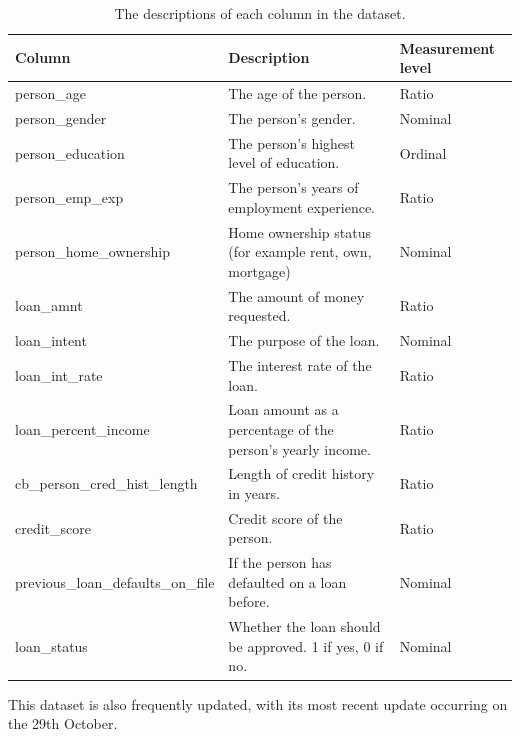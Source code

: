 \documentclass[12pt]{report}
\begin{document}
\begin{table}[H]
    \centering
    \begin{tabular}{|p{}| p{}| p{} |}
        \hline
        \cellcolor{blue!25}Column & \cellcolor{blue!25}Description & \cellcolor{blue!25}Measurement level\\
            \hline
            person\_age & The age of the person. & Ratio\\
            \hline
            person\_gender & The person's gender. & Nominal\\
            \hline
            person\_education & The person's highest level of education. & Ordinal\\
            \hline
            person\_emp\_exp & The person's years of employment experience. & Ratio\\
            \hline
            person\_home\_ownership & Home ownership status (for example rent, own, mortgage)
            & Nominal\\
            \hline
            loan\_amnt & The amount of money requested. & Ratio\\
            \hline
            loan\_intent & The purpose of the loan. & Nominal\\
            \hline
            loan\_int\_rate & The interest rate of the loan. & Ratio\\
            \hline
            loan\_percent\_income & Loan amount as a percentage of the person's yearly income.
            & Ratio\\
            \hline
            cb\_person\_cred\_hist\_length & Length of credit history in years. & Ratio\\
            \hline
            credit\_score & Credit score of the person. & Ratio\\
            \hline
            previous\_loan\_defaults\_on\_file & If the person has defaulted on a loan before.
            & Nominal \\
            \hline
            loan\_status & Whether the loan should be approved. 1 if yes, 0 if no.
            & Nominal\\
            \hline
    \end{tabular}
    \caption{The descriptions of each column in the dataset.}\label{tab:Loan-Types}
\end{table}

This dataset is also frequently updated, with its most recent update occurring on the 29th October.
\end{document}

